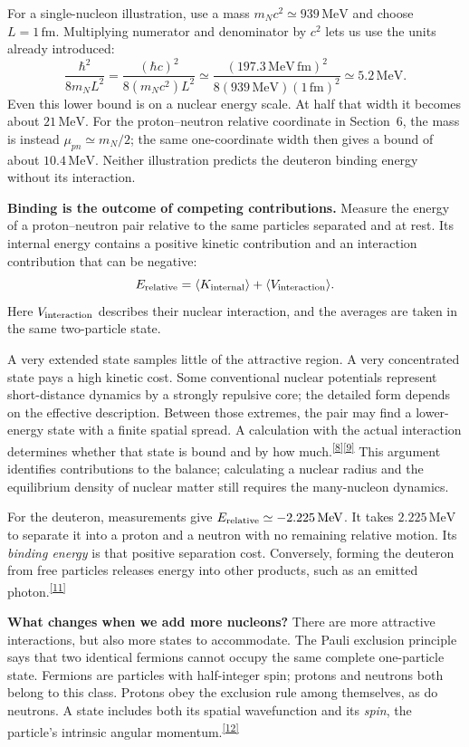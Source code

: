 \documentclass[11pt]{article}
\newcommand{\refn}[1]{\textsuperscript{\hyperlink{src#1}{[#1]}}}
\begin{document}
For a single-nucleon illustration, use a mass $m_Nc^2\simeq939\,\mathrm{MeV}$ and
choose $L=1\,\mathrm{fm}$. Multiplying numerator and denominator by $c^2$
lets us use the units already introduced:
\[
\frac{\hbar^2}{8m_NL^2}
=\frac{(\hbar c)^2}{8(m_Nc^2)L^2}
\simeq\frac{(197.3\,\mathrm{MeV\,fm})^2}
{8(939\,\mathrm{MeV})(1\,\mathrm{fm})^2}
\simeq5.2\,\mathrm{MeV}.
\]
Even this lower bound is on a nuclear energy scale. At half that width it becomes about $21\,\mathrm{MeV}$. For the proton--neutron relative coordinate in Section~6, the mass is instead $\mu_{pn}\simeq m_N/2$; the same one-coordinate width then gives a bound of about $10.4\,\mathrm{MeV}$. Neither illustration predicts the deuteron binding energy without its interaction.

\textbf{Binding is the outcome of competing contributions.}
Measure the energy of a proton--neutron pair relative to the same particles
separated and at rest. Its internal energy contains a positive kinetic
contribution and an interaction contribution that can be negative:
\[
E_{\rm relative}=\langle K_{\rm internal}\rangle+\langle V_{\rm interaction}\rangle.
\]
Here $V_{\rm interaction}$ describes their nuclear interaction, and the
averages are taken in the same two-particle state.

A very extended state samples little of the attractive region. A very concentrated state pays a high kinetic cost. Some conventional nuclear potentials represent short-distance dynamics by a strongly repulsive core; the detailed form depends on the effective description. Between those extremes,
the pair may find a lower-energy state with a finite spatial spread. A
calculation with the actual interaction determines whether that state is
bound and by how much.\refn{8}\refn{9}
This argument identifies contributions to the balance; calculating a nuclear radius and the equilibrium density of nuclear matter still requires the many-nucleon dynamics.

For the deuteron, measurements give
$E_{\rm relative}\simeq-2.225\,\mathrm{MeV}$. It takes
$2.225\,\mathrm{MeV}$ to separate it into a proton and a neutron with no
remaining relative motion. Its \emph{binding energy} is that positive
separation cost. Conversely, forming the deuteron from free particles releases
energy into other products, such as an emitted photon.\refn{11}

\textbf{What changes when we add more nucleons?}
There are more attractive interactions, but also more states to accommodate.
The Pauli exclusion principle says that two identical fermions cannot occupy
the same complete one-particle state. Fermions are particles with half-integer
spin; protons and neutrons both belong to this class. Protons obey the
exclusion rule among themselves, as do neutrons. A state includes both its
spatial wavefunction and its \emph{spin}, the particle's intrinsic angular
momentum.\refn{12}
\end{document}
